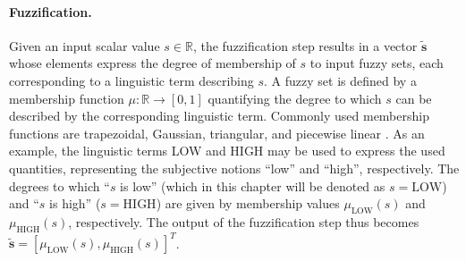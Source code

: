 \paragraph{Fuzzification.} Given an input scalar value $s\in\mathbb{R}$, the fuzzification step results in a vector $\tilde{\mathbf{s}}$ whose elements express the degree of membership of $s$  to input fuzzy sets, each corresponding to a linguistic term describing $s$. A fuzzy set is defined by a membership function $\mu:\mathbb{R}\rightarrow[0,1]$ quantifying the degree to which $s$ can be described by the corresponding linguistic term. Commonly used membership functions are trapezoidal, Gaussian, triangular, and piecewise linear \cite{mendel1995fuzzy}. As an example, the linguistic terms LOW and HIGH may be used to express the used quantities, representing the subjective notions ``low'' and ``high'', respectively. The degrees to which ``$s$ is low'' (which in this chapter will be denoted as $s=\textrm{LOW}$) and ``$s$ is high'' ($s=\textrm{HIGH}$) are given by membership values $\mu_{\textrm{LOW}}(s)$ and $\mu_{\textrm{HIGH}}(s)$, respectively. The output of the fuzzification step thus becomes $\tilde{\mathbf{s}}=[\mu_{\textrm{LOW}}(s),\mu_{\textrm{HIGH}}(s)]^{T}$.
